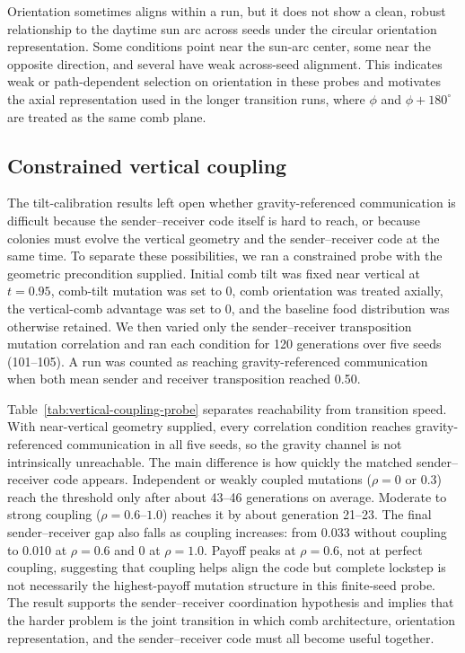\documentclass[11pt]{article}
\begin{document}


Orientation sometimes aligns within a run, but it does not show a clean,
robust relationship to the daytime sun arc across seeds under the circular
orientation representation. Some conditions point near the sun-arc center, some
near the opposite direction, and several have weak across-seed alignment. This
indicates weak or path-dependent selection on orientation in these probes and
motivates the axial representation used in the longer transition runs, where
$\phi$ and $\phi + 180^\circ$ are treated as the same comb plane.

\subsection{Constrained vertical coupling}

The tilt-calibration results left open whether gravity-referenced
communication is difficult because the sender--receiver code itself is hard to
reach, or because colonies must evolve the vertical geometry and the
sender--receiver code at the same time. To separate these possibilities, we ran
a constrained probe with the geometric precondition supplied. Initial comb tilt
was fixed near vertical at $t=0.95$, comb-tilt mutation was set to 0, comb
orientation was treated axially, the vertical-comb advantage was set to 0, and
the baseline food distribution was otherwise retained. We then varied only the
sender--receiver transposition mutation correlation and ran each condition for
120 generations over five seeds (101--105). A run was counted as reaching
gravity-referenced communication when both mean sender and receiver
transposition reached 0.50.



Table~\ref{tab:vertical-coupling-probe} separates reachability from transition
speed. With near-vertical geometry supplied, every correlation condition
reaches gravity-referenced communication in all five seeds, so the gravity
channel is not intrinsically unreachable. The main difference is how quickly
the matched sender--receiver code appears. Independent or weakly coupled
mutations ($\rho=0$ or $0.3$) reach the threshold only after about 43--46
generations on average. Moderate to strong coupling ($\rho=0.6$--$1.0$)
reaches it by about generation 21--23. The final sender--receiver gap also
falls as coupling increases: from 0.033 without coupling to 0.010 at
$\rho=0.6$ and 0 at $\rho=1.0$. Payoff peaks at $\rho=0.6$, not at perfect
coupling, suggesting that coupling helps align the code but complete lockstep
is not necessarily the highest-payoff mutation structure in this finite-seed
probe. The result supports the sender--receiver coordination hypothesis and
implies that the harder problem is the joint transition in which comb
architecture, orientation representation, and the sender--receiver code must
all become useful together.
\end{document}
